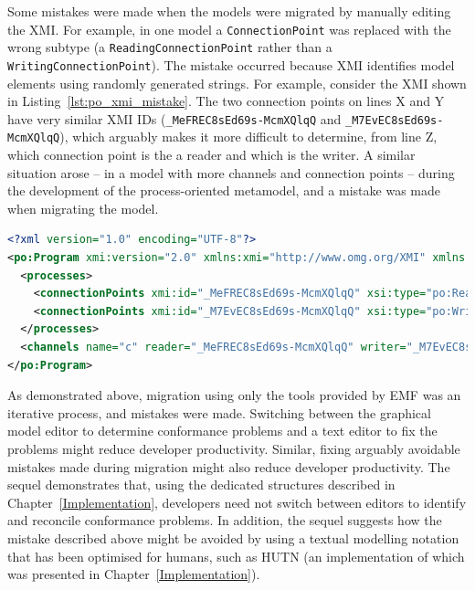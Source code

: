 


Some mistakes were made when the models were migrated by manually editing the XMI. For example, in one model a \texttt{Co\-nn\-ec\-ti\-onPo\-in\-t} was replaced with the wrong subtype (a \texttt{Re\-ad\-i\-ngCo\-nn\-ec\-ti\-o\-nPo\-i\-nt} rather than a \texttt{Wr\-i\-ti\-ngCo\-nn\-ec\-ti\-o\-nPo\-i\-nt}). The mistake occurred because XMI identifies model elements using randomly generated strings. For example, consider the XMI shown in Listing~\ref{lst:po_xmi_mistake}. The two connection points on lines X and Y have very similar XMI IDs (\texttt{\_MeFREC8sEd69s-McmXQlqQ} and \texttt{\_M7EvEC8sEd69s-McmXQlqQ}), which arguably makes it more difficult to determine, from line Z, which connection point is the a reader and which is the writer. A similar situation arose -- in a model with more channels and connection points -- during the development of the process-oriented metamodel, and a mistake was made when migrating the model.


\begin{lstlisting}[caption=XMI containing elements with similar IDs, label=lst:po_xmi_mistake, language=XML]
<?xml version="1.0" encoding="UTF-8"?>
<po:Program xmi:version="2.0" xmlns:xmi="http://www.omg.org/XMI" xmlns:xsi="http://www.w3.org/2001/XMLSchema-instance" xmlns:po="po">
  <processes>
    <connectionPoints xmi:id="_MeFREC8sEd69s-McmXQlqQ" xsi:type="po:ReadingConnectionPoint" name="in"/>
    <connectionPoints xmi:id="_M7EvEC8sEd69s-McmXQlqQ" xsi:type="po:WritingConnectionPoint" name="out"/>
  </processes>
  <channels name="c" reader="_MeFREC8sEd69s-McmXQlqQ" writer="_M7EvEC8sEd69s-McmXQlqQ"/>
</po:Program>
\end{lstlisting}


As demonstrated above, migration using only the tools provided by EMF was an iterative process, and mistakes were made. Switching between the graphical model editor to determine conformance problems and a text editor to fix the problems might reduce developer productivity. Similar, fixing arguably avoidable mistakes made during migration might also reduce developer productivity. The sequel demonstrates that, using the dedicated structures described in Chapter~\ref{Implementation}, developers need not switch between editors to identify and reconcile conformance problems. In addition, the sequel suggests how the mistake described above might be avoided by using a textual modelling notation that has been optimised for humans, such as HUTN (an implementation of which was presented in Chapter~\ref{Implementation}).


